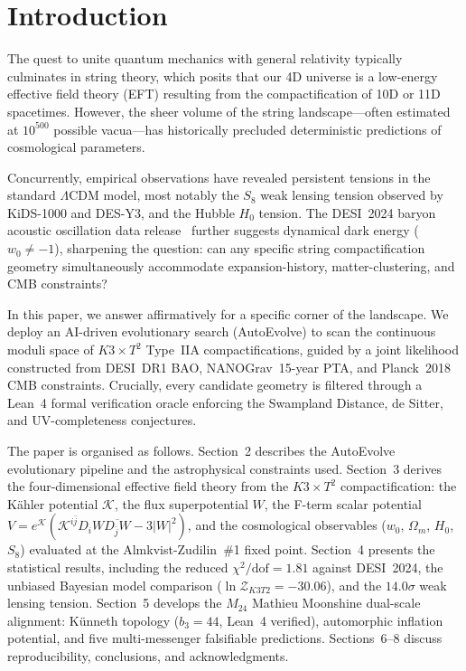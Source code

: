 \section{Introduction}

The quest to unite quantum mechanics with general relativity typically culminates in string theory, which posits that our 4D universe is a low-energy effective field theory (EFT) resulting from the compactification of 10D or 11D spacetimes. However, the sheer volume of the string landscape---often estimated at $10^{500}$ possible vacua---has historically precluded deterministic predictions of cosmological parameters. 

Concurrently, empirical observations have revealed persistent tensions in the standard $\Lambda$CDM model, most notably the $S_8$ weak lensing tension observed by KiDS-1000 and DES-Y3, and the Hubble $H_0$ tension.  The DESI~2024 baryon acoustic oscillation data release~\cite{DESI2024} further suggests dynamical dark energy ($w_0 \neq -1$), sharpening the question: can any specific string compactification geometry simultaneously accommodate expansion-history, matter-clustering, and CMB constraints?

In this paper, we answer affirmatively for a specific corner of the landscape.  We deploy an AI-driven evolutionary search (AutoEvolve) to scan the continuous moduli space of $K3 \times T^2$ Type~IIA compactifications, guided by a joint likelihood constructed from DESI~DR1 BAO, NANOGrav~15-year PTA, and Planck~2018 CMB constraints.  Crucially, every candidate geometry is filtered through a Lean~4 formal verification oracle enforcing the Swampland Distance, de Sitter, and UV-completeness conjectures.

The paper is organised as follows.  Section~2 describes the AutoEvolve evolutionary pipeline and the astrophysical constraints used.  Section~3 derives the four-dimensional effective field theory from the $K3 \times T^2$ compactification: the K\"ahler potential $\mathcal{K}$, the flux superpotential $W$, the F-term scalar potential $V = e^{\mathcal{K}}(\mathcal{K}^{i\bar{j}} D_i W \overline{D_{\bar{j}} W} - 3|W|^2)$, and the cosmological observables ($w_0$, $\Omega_m$, $H_0$, $S_8$) evaluated at the Almkvist-Zudilin~\#1 fixed point.  Section~4 presents the statistical results, including the reduced $\chi^2/\text{dof} = 1.81$ against DESI~2024, the unbiased Bayesian model comparison ($\ln\mathcal{Z}_{K3T2} = -30.06$), and the $14.0\sigma$ weak lensing tension.  Section~5 develops the $M_{24}$ Mathieu Moonshine dual-scale alignment: Künneth topology ($b_3 = 44$, Lean~4 verified), automorphic inflation potential, and five multi-messenger falsifiable predictions.  Sections~6--8 discuss reproducibility, conclusions, and acknowledgments.
